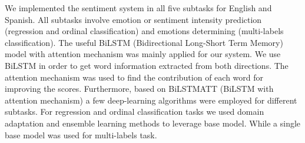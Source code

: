 We implemented the sentiment system in all five subtasks for English and Spanish. All subtasks involve emotion or sentiment intensity prediction (regression and ordinal classification) and emotions determining (multi-labels classification). The useful BiLSTM (Bidirectional Long-Short Term Memory) model with attention mechanism was mainly applied for our system. We use BiLSTM in order to get word information extracted from both directions. The attention mechanism was used to find the contribution of each word for improving the scores. Furthermore, based on BiLSTMATT (BiLSTM with attention mechanism) a few deep-learning algorithms were employed for different subtasks. For regression and ordinal classification tasks we used domain adaptation and ensemble learning methods to leverage base model. While a single base model was used for multi-labels task.
